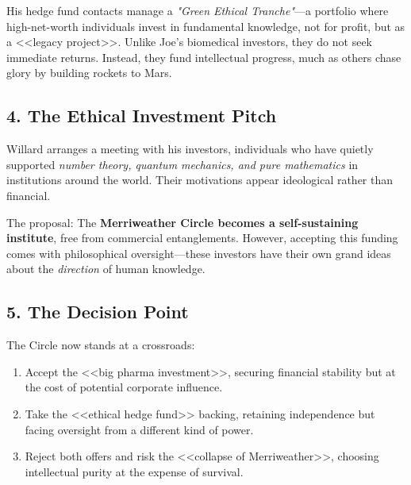\smallskip

His hedge fund contacts manage a \textit{"Green Ethical Tranche"}—a portfolio where high-net-worth individuals invest in fundamental knowledge, not for profit, but as a <<legacy project>>. Unlike Joe’s biomedical investors, they do not seek immediate returns. Instead, they fund intellectual progress, much as others chase glory by building rockets to Mars.

\subsection*{4. The Ethical Investment Pitch}

Willard arranges a meeting with his investors, individuals who have quietly supported \textit{number theory, quantum mechanics, and pure mathematics} in institutions around the world. Their motivations appear ideological rather than financial.

\smallskip

The proposal: The \textbf{Merriweather Circle becomes a self-sustaining institute}, free from commercial entanglements. However, accepting this funding comes with philosophical oversight—these investors have their own grand ideas about the \textit{direction} of human knowledge.

\subsection*{5. The Decision Point}

The Circle now stands at a crossroads:
\begin{enumerate}
    \item Accept the <<big pharma investment>>, securing financial stability but at the cost of potential corporate influence.
    \item Take the <<ethical hedge fund>> backing, retaining independence but facing oversight from a different kind of power.
    \item Reject both offers and risk the <<collapse of Merriweather>>, choosing intellectual purity at the expense of survival.
\end{enumerate}

